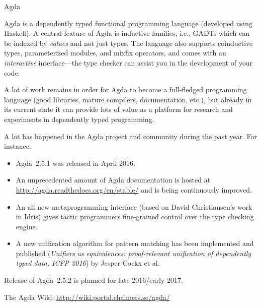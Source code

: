 \documentclass{article}
\begin{document}
\begin{hcarentry}{Agda}
\label{agda}
\makeheader

Agda is a dependently typed functional programming language (developed
using Haskell). A central feature of Agda is inductive families,
i.e., GADTs which can be indexed by \emph{values} and not just types.
The language also supports coinductive types, parameterized modules,
and mixfix operators, and comes with an \emph{interactive}
interface---the type checker can assist you in the development of your
code.

A lot of work remains in order for Agda to become a full-fledged
programming language (good libraries, mature compilers, documentation,
etc.), but already in its current state it can provide lots of value as a
platform for research and experiments in dependently typed programming.

A lot has happened in the Agda project and community during the past year.
For instance:
\begin{itemize}
\item Agda~2.5.1 was released in April 2016.
\item An unprecedented amount of Agda documentation is hosted at
\url{http://agda.readthedocs.org/en/stable/} and is being continuously improved.
\item An all new metaprogramming interface (based on David Christiansen's
work in Idris) gives tactic programmers fine-grained control over the
type checking engine.
\item A new unification algorithm for pattern matching has been implemented
and published ({\em Unifiers as equivalences: proof-relevant unification of
dependently typed data, ICFP 2016}) by Jesper Cockx et al.
\end{itemize}
Release of Agda~2.5.2 is planned for late 2016/early 2017.

\FurtherReading
  The Agda Wiki: \url{http://wiki.portal.chalmers.se/agda/}
\end{hcarentry}
\end{document}
